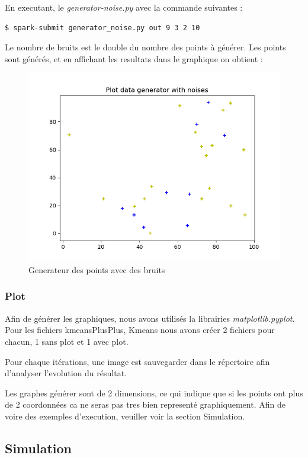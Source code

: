 \documentclass[french]{article}
\begin{document}
\noindent En executant, le \textit{generator-noise.py} avec la commande suivantes : 
\begin{lstlisting}[language=bash]
  $ spark-submit generator_noise.py out 9 3 2 10
\end{lstlisting}
Le nombre de bruits est le double du nombre des points à générer. 
Les points sont générés, et en affichant les resultats dans le graphique on obtient :
\begin{figure}[h!]
  \centering
  \includegraphics[width=\linewidth]{img/generator-noises.png}
  \caption{Generateur des points avec des bruits}
\end{figure}

\newpage
\subsubsection{Plot}
Afin de générer les graphiques, nous avons utilisés la librairies \textit{matplotlib.pyplot}.\\
Pour les fichiers kmeansPlusPlus, Kmeans nous avons créer 2 fichiers pour chacun, 1 sans plot et 1 avec plot.

Pour chaque itérations, une image est sauvegarder dans le répertoire afin d'analyser l'evolution du résultat.

Les graphes générer sont de 2 dimensions, ce qui indique que si les points ont plus de 2 coordonnées ca ne seras pas tres bien representé graphiquement.
Afin de voire des exemples d'execution, veuiller voir la section Simulation.

\newpage
\subsection{Simulation}
\end{document}
